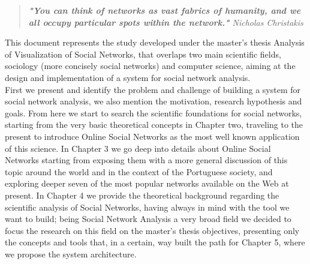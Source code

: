 
\begin{quote}
\textit{\textbf{"You can think of networks as vast fabrics of humanity, and we all occupy particular spots within the network."} Nicholas Christakis}
\end{quote}

This document represents the study developed under the master's thesis Analysis of Visualization of Social Networks, that overlaps
two main scientific fields, sociology (more concisely social networks) and computer science, aiming at the design and implementation of a system for social network analysis.\\

\indent First we present and identify the problem and challenge of building a system for social network analysis, we also mention the motivation, research hypothesis and goals. From here we start to search the scientific foundations for social networks, starting from the very basic theoretical concepts in Chapter two, traveling to the present to introduce Online Social Networks as the most well known application of this science. In Chapter 3 we go deep into details about Online Social Networks starting from exposing them with a more general discussion of this topic around the world and in the context of the Portuguese society, and exploring deeper seven of the most popular networks available on the Web at present. In Chapter 4 we provide the theoretical background regarding the scientific analysis of Social Networks, having always in mind with the tool we want to build; being Social Network Analysis a very broad field we decided to focus the research on this field on the master's thesis objectives, presenting only the concepts and tools that, in a certain, way built the path for Chapter 5, where we propose the system architecture.\\

